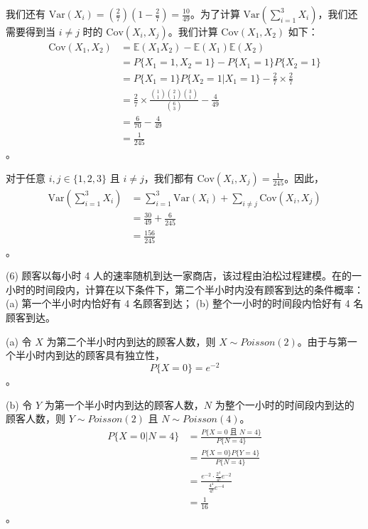 \begin{questions}
\begin{solution}
我们还有 $\text{Var}(X_i) = \left(\frac{2}{7}\right) \left(1 - \frac{2}{7}\right) = \frac{10}{49}$。为了计算 $\text{Var}\left(\sum_{i=1}^3 X_i\right)$，我们还需要得到当 $i \neq j$ 时的 $\text{Cov}(X_i, X_j)$。我们计算 $\text{Cov}(X_1, X_2)$ 如下：
\begin{align*}
\text{Cov}(X_1, X_2) &= \mathbb{E}(X_1 X_2) - \mathbb{E}(X_1) \mathbb{E}(X_2) \\
&= P\{X_1 = 1, X_2 = 1\} - P\{X_1 = 1\} P\{X_2 = 1\} \\
&= P\{X_1 = 1\} P\{X_2 = 1 | X_1 = 1\} - \frac{2}{7} \times \frac{2}{7} \\
&= \frac{2}{7} \times \frac{\binom{1}{1} \binom{2}{1} \binom{3}{1}}{\binom{6}{3}} - \frac{4}{49} \\
&= \frac{6}{70} - \frac{4}{49} \\
&= \frac{1}{245}
\end{align*}。

对于任意 $i, j \in \{1, 2, 3\}$ 且 $i \neq j$，我们都有 $\text{Cov}(X_i, X_j) = \frac{1}{245}$。因此，
\begin{align*}
\text{Var}\left(\sum_{i=1}^3 X_i\right) &= \sum_{i=1}^3 \text{Var}(X_i) + \sum_{i \neq j} \text{Cov}(X_i, X_j) \\
&= \frac{30}{49} + \frac{6}{245} \\
&= \frac{156}{245}
\end{align*}。
\end{solution}

\question (6) 顾客以每小时 4 人的速率随机到达一家商店，该过程由泊松过程建模。在的一小时的时间段内，计算在以下条件下，第二个半小时内没有顾客到达的条件概率：
(a) 第一个半小时内恰好有 4 名顾客到达；
(b) 整个一小时的时间段内恰好有 4 名顾客到达。

\begin{solution}
(a) 令 $X$ 为第二个半小时内到达的顾客人数，则 $X \sim Poisson(2)$。由于与第一个半小时内到达的顾客具有独立性，
\[
P\{X = 0\} = e^{-2}
\]。

(b) 令 $Y$ 为第一个半小时内到达的顾客人数，$N$ 为整个一小时的时间段内到达的顾客人数，则 $Y \sim Poisson(2)$ 且 $N \sim Poisson(4)$。
\begin{align*}
P\{X = 0 | N = 4\} &= \frac{P\{X = 0 \text{ 且 } N = 4\}}{P\{N = 4\}} \\
&= \frac{P\{X = 0\} P\{Y = 4\}}{P\{N = 4\}} \\
&= \frac{e^{-2} \cdot \frac{2^4}{4!} e^{-2}}{\frac{4^4}{4!} e^{-4}} \\
&= \frac{1}{16}
\end{align*}。
\end{solution}


\end{questions}
